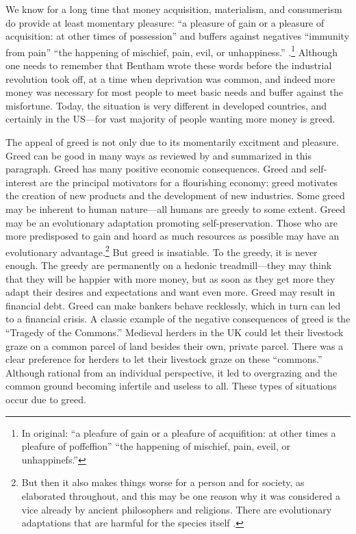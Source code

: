 \documentclass[10pt, letterpaper]{article}
\begin{document}
\begin{spacing}{1.8}






We know for a long time that money acquisition, materialism, and consumerism do provide at least momentary pleasure: ``a pleasure of gain or a pleasure of
acquisition: at other times of possession'' and buffers against negatives
``immunity from pain'' ``the happening of mischief, pain, evil, or
unhappiness.'' \citep[Bentham cited in ]{cummins2019jeremy}.\footnote{In original: ``a pleafure of gain or a pleafure of acquifition: at other times a pleafure of poffeffion'' ``the happening of mischief, pain, eveil, or unhappinefs.''}
Although one needs to remember that Bentham wrote these words before the industrial revolution took off, at a time when deprivation was common, and
indeed more money was necessary for most people to meet basic needs and buffer
against the misfortune. Today, the situation is very different in developed
countries, and certainly in the US---for vast majority of people wanting more money is greed. 


The appeal of greed is not only due to its momentarily excitment and pleasure. 
Greed can be good in many ways as reviewed by \citet{seuntjens15b} and
summarized in this paragraph. Greed has many positive economic consequences. Greed and self-interest are the principal motivators for a flourishing economy: greed motivates the creation of new
products and the development of new industries. 
Some greed may be inherent to human nature---all humans are greedy to some extent. %
Greed may be an evolutionary adaptation promoting self-preservation. Those who are more predisposed to gain and hoard as much resources as possible may have an
evolutionary advantage.\footnote{But then it also makes things worse for a person and for society, as elaborated throughout, and this may be one reason why
it was considered a vice already by ancient philosophers and religions. There are evolutionary adaptations that are harmful for the species itself \citep{frank12}.}
%
But greed is insatiable. To the greedy, it is never enough. The greedy are permanently on a hedonic treadmill---they may think that they will be happier
with more money, but as soon as they get more they adapt their desires and expectations and want even more.
%
Greed may result in financial debt. Greed can make  bankers behave recklessly, which in turn can led to a financial crisis. A classic example of the
negative consequences of greed is the ``Tragedy of the Commons.'' Medieval herders in the UK could let their livestock graze on a common parcel of land besides their own, private parcel. There was a clear preference
for herders to let their livestock graze on these ``commons.'' Although rational from an
individual perspective, it led to overgrazing and the common ground becoming infertile and useless to all.  These types of situations occur due to greed.


\end{spacing}
\end{document}
